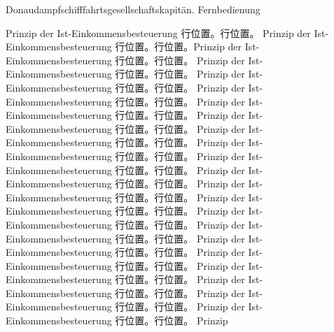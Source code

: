 \documentclass{scrbook}
\begin{document}
\parbox{5pt}{\hspace{5pt}Donaudampfschifffahrtsgesellschaftskapitän. Fernbedienung 

Prinzip der Ist-Einkommensbesteuerung 行位置。行位置。
Prinzip der Ist-Einkommensbesteuerung 行位置。行位置。Prinzip der Ist-Einkommensbesteuerung 行位置。行位置。
Prinzip der Ist-Einkommensbesteuerung 行位置。行位置。
Prinzip der Ist-Einkommensbesteuerung 行位置。行位置。
Prinzip der Ist-Einkommensbesteuerung 行位置。行位置。
Prinzip der Ist-Einkommensbesteuerung 行位置。行位置。
Prinzip der Ist-Einkommensbesteuerung 行位置。行位置。
Prinzip der Ist-Einkommensbesteuerung 行位置。行位置。
Prinzip der Ist-Einkommensbesteuerung 行位置。行位置。
Prinzip der Ist-Einkommensbesteuerung 行位置。行位置。
Prinzip der Ist-Einkommensbesteuerung 行位置。行位置。
Prinzip der Ist-Einkommensbesteuerung 行位置。行位置。
Prinzip der Ist-Einkommensbesteuerung 行位置。行位置。
Prinzip der Ist-Einkommensbesteuerung 行位置。行位置。
Prinzip der Ist-Einkommensbesteuerung 行位置。行位置。
Prinzip der Ist-Einkommensbesteuerung 行位置。行位置。
Prinzip der Ist-Einkommensbesteuerung 行位置。行位置。
Prinzip der Ist-Einkommensbesteuerung 行位置。行位置。
Prinzip der Ist-Einkommensbesteuerung 行位置。行位置。
Prinzip der Ist-Einkommensbesteuerung 行位置。行位置。
Prinzip der Ist-Einkommensbesteuerung 行位置。行位置。
Prinzip }
\end{document}
